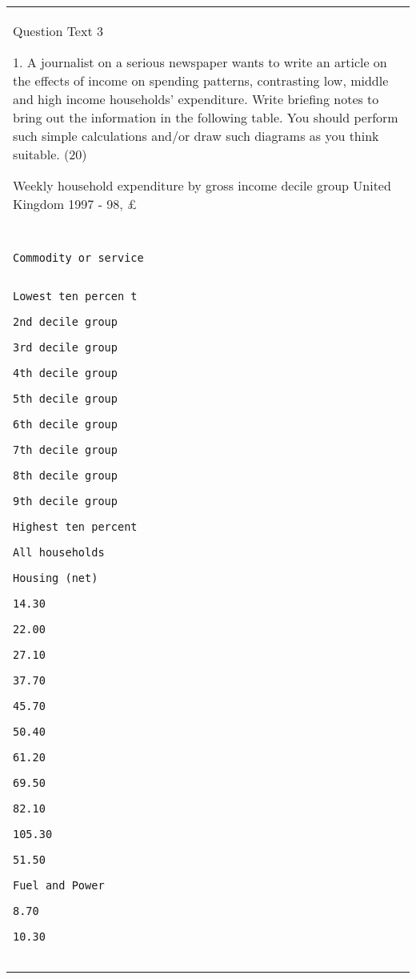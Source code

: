 \documentclass[a4paper,12pt]{article}
\begin{document}
\begin{table}[ht!]
 
\centering
 
\begin{tabular}{|p{15cm}|}
 
\hline  

Question Text 3 


1. A journalist on a serious newspaper wants to write an article on the effects of income on spending patterns, contrasting low, middle and high income households’ expenditure.  Write briefing notes to bring out the information in the following table.  You should perform such simple calculations and/or draw such diagrams as you think suitable. (20) 
 
 
Weekly household expenditure by gross income decile group United Kingdom 1997 - 98,  £ 
 
\begin{verbatim}
 
 
Commodity or service 
 
 
Lowest ten percen t 
 
2nd decile group 
 
3rd decile group 
 
4th decile group 
 
5th decile group 
 
6th decile group 
 
7th decile group 
 
8th decile group 
 
9th decile group 
 
Highest ten percent 
 
All households 
 
Housing (net) 
 
14.30 
 
22.00 
 
27.10 
 
37.70 
 
45.70 
 
50.40 
 
61.20 
 
69.50 
 
82.10 
 
105.30 
 
51.50 
 
Fuel and Power 
 
8.70 
 
10.30 
 

\end{verbatim}
\end{tabular}
\end{table}
\end{document}
